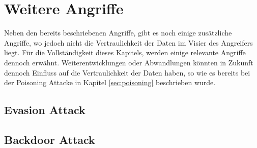 \section{Weitere Angriffe}

Neben den bereits beschriebenen Angriffe, gibt es noch einige zusätzliche Angriffe, wo jedoch nicht die Vertraulichkeit der Daten im Visier des Angreifers liegt. 
Für die Vollständigkeit dieses Kapitels, werden einige relevante Angriffe dennoch erwähnt.
Weiterentwicklungen oder Abwandlungen könnten in Zukunft dennoch Einfluss auf die Vertraulichkeit der Daten haben, so wie es bereits bei der Poisoning Attacke in Kapitel \ref{sec:poisoning} beschrieben wurde.

\subsection{Evasion Attack}



\subsection{Backdoor Attack}